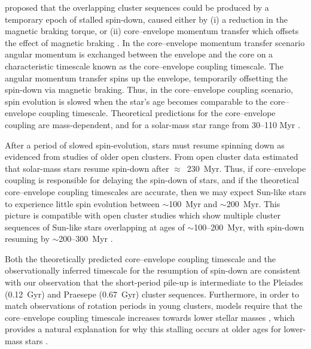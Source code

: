\documentclass[linenumbers,tighten,trackchanges,twocolumn]{aastex631}
\begin{document}
\citet{Curtis2019a, Curtis2020} proposed that the overlapping cluster sequences could be produced by a temporary epoch of stalled spin-down, caused either by (i) a reduction in the magnetic braking torque, or (ii) core–envelope momentum transfer which offsets the effect of magnetic braking \citep[e.g.][]{MacGregor1991}. In the core–envelope momentum transfer scenario angular momentum is exchanged between the envelope and the core on a characteristic timescale known as the core–envelope coupling timescale. The angular momentum transfer spins up the envelope, temporarily offsetting the spin-down via magnetic braking. Thus, in the core–envelope coupling scenario, spin evolution is slowed when the star's age becomes comparable to the core–envelope coupling timescale. Theoretical predictions for the core–envelope coupling are mass-dependent, and for a solar-mass star range from 30--110 Myr \citep{Bouvier2008, IrwinBouvier2009, Denissenkov2010, GalletBouvier2015, Lanzafame2015, Somers2016, Spada2020}. 

After a period of slowed spin-evolution, stars must resume spinning down as evidenced from studies of older open clusters. From open cluster data \citet{Curtis2020} estimated that solar-mass stars resume spin-down after $\approx$~230~Myr. Thus, if core–envelope coupling is responsible for delaying the spin-down of stars, and if the theoretical core–envelope coupling timescales are accurate, then we may expect Sun-like stars to experience little spin evolution between $\sim$100~Myr and $\sim$200~Myr. This picture is compatible with open cluster studies which show multiple cluster sequences of Sun-like stars overlapping at ages of $\sim$100--200~Myr, with spin-down resuming by $\sim$200--300~Myr \citep{Fritzewski2020,Fritzewski2021}. 

Both the theoretically predicted core–envelope coupling timescale and the observationally inferred timescale for the resumption of spin-down are consistent with our observation that the short-period pile-up is intermediate to the Pleiades (0.12~Gyr) and Praesepe (0.67~Gyr) cluster sequences. Furthermore, in order to match observations of rotation periods in young clusters, models require that the core–envelope coupling timescale increases towards lower stellar masses \citep[e.g.][]{Irwin2007, Denissenkov2010, GalletBouvier2015}, which provides a natural explanation for why this stalling occurs at older ages for lower-mass stars \citep{Curtis2020}. 
\end{document}
